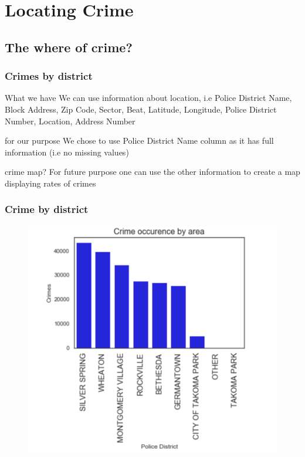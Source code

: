 \documentclass[usenames,dvipsnames]{beamer}
\begin{document}
\section{Locating Crime}
\subsection{The where of crime?}
\begin{frame}
\frametitle{Crimes by district}
\begin{block}{What we have}
We can use information about location, i.e Police District Name, Block Address, Zip Code, Sector, Beat, Latitude, Longitude, Police District Number, Location, Address Number
\end{block}
\begin{block}{for our purpose}
We chose to use Police District Name column as it has full information (i.e no missing values)
\end{block}
\begin{block}{ crime map?}
For future purpose one can use the other information to create a map displaying rates of crimes
\end{block}
\end{frame}
\begin{frame}
\frametitle{Crime by district}
\graphicspath{{Figures//}}
\vspace{-0.5cm}
\begin{figure}[htbp]
\centering
\includegraphics[width= 3.0 in]{crime_bydistrict}
\label{crime_bydistrict.}
\end{figure}
\end{frame}
\end{document}
